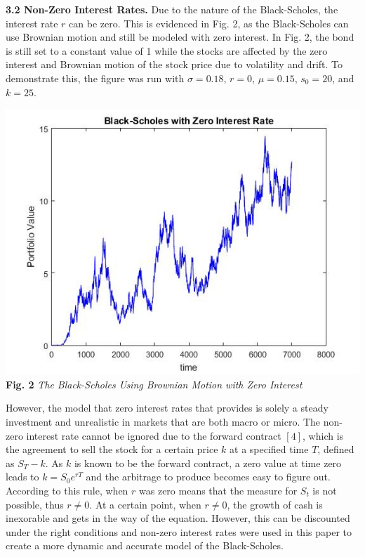 \documentclass{report}
\begin{document}
	\textbf{3.2 Non-Zero Interest Rates.} Due to the nature of the Black-Scholes, the interest rate $r$ can be zero. This is evidenced in Fig. 2, as the Black-Scholes can use Brownian motion and still be modeled with zero interest. In Fig. 2, the bond is still set to a constant value of 1 while the stocks are affected by the zero interest and Brownian motion of the stock price due to volatility and drift. To demonstrate this, the figure was run with $\sigma = 0.18$, $r=0$, $\mu=0.15$, $s_0 = 20$, and $k = 25$.
	\begin{center}
		\includegraphics[scale=0.4]{zerointerest}
		\\ \textbf{Fig. 2} \textit{The Black-Scholes Using Brownian Motion with Zero Interest}
	\end{center}
	
	However, the model that zero interest rates that provides is solely a steady investment and unrealistic in markets that are both macro or micro. The non-zero interest rate cannot be ignored due to the forward contract $[4]$, which is the agreement to sell the stock for a certain price $k$ at a specified time $T$, defined as $S_T - k$. As $k$ is known to be the forward contract, a zero value at time zero leads to $k = S_0e^{rT}$ and the arbitrage to produce becomes easy to figure out. According to this rule, when $r$ was zero means that the measure for $S_t$ is not possible, thus $r \ne 0$. At a certain point, when $r \ne 0$, the growth of cash is inexorable and gets in the way of the equation. However, this can be discounted under the right conditions and non-zero interest rates were used in this paper to create a more dynamic and accurate model of the Black-Scholes.
	\\
	
\end{document}
